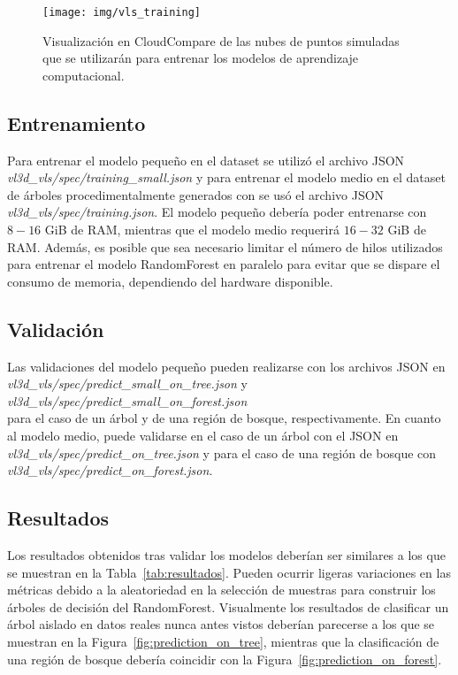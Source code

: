 \documentclass[]{article}
\begin{document}
	
	\begin{figure}[H]
		\centering
		\texttt{[image: img/vls\_training]}
		\caption{Visualización en CloudCompare de las nubes de puntos simuladas que se utilizarán para entrenar los modelos de aprendizaje computacional.}
		\label{fig:vls_training}
	\end{figure}
	
	
	\pagebreak
	
	\subsection*{Entrenamiento}
	Para entrenar el modelo pequeño en el dataset \cite{wytham_woods} se utilizó el archivo JSON \mbox{\textit{vl3d\_vls/spec/training\_small.json}} y para entrenar el modelo medio en el dataset de árboles procedimentalmente generados con \cite{proc_trees} se usó el archivo JSON \mbox{\textit{vl3d\_vls/spec/training.json}}. El modelo pequeño debería poder entrenarse con $8-16$ GiB de RAM, mientras que el modelo medio requerirá $16-32$ GiB de RAM. Además, es posible que sea necesario limitar el número de hilos utilizados para entrenar el modelo RandomForest en paralelo para evitar que se dispare el consumo de memoria, dependiendo del hardware disponible.
	
	
	\subsection*{Validación}
	Las validaciones del modelo pequeño pueden realizarse con los archivos JSON en \hfill \\ \mbox{\textit{vl3d\_vls/spec/predict\_small\_on\_tree.json}} y \mbox{\textit{vl3d\_vls/spec/predict\_small\_on\_forest.json}} \hfill \\
	para el caso de un árbol y de una región de bosque, respectivamente. En cuanto al modelo medio, puede validarse en el caso de un árbol con el JSON en \mbox{\textit{vl3d\_vls/spec/predict\_on\_tree.json}} y para el caso de una región de bosque con \mbox{\textit{vl3d\_vls/spec/predict\_on\_forest.json}}.
	
	
	\subsection*{Resultados}	
	Los resultados obtenidos tras validar los modelos deberían ser similares a los que se muestran en la Tabla~\ref{tab:resultados}. Pueden ocurrir ligeras variaciones en las métricas debido a la aleatoriedad en la selección de muestras para construir los árboles de decisión del RandomForest. Visualmente los resultados de clasificar un árbol aislado en datos reales nunca antes vistos deberían parecerse a los que se muestran en la Figura~\ref{fig:prediction_on_tree}, mientras que la clasificación de una región de bosque debería coincidir con la Figura~\ref{fig:prediction_on_forest}.
	
\end{document}
